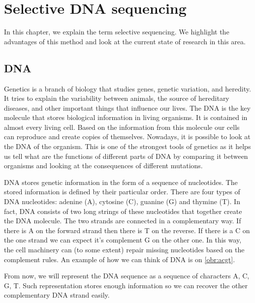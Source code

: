 \chapter{Selective DNA sequencing}
\label{kap:selSeq}

In this chapter, we explain the term selective sequencing. We highlight the
advantages of this method and look at the current state of research in this area.

\section{DNA}

Genetics is a branch of biology that studies genes, genetic variation, and heredity.
It tries to explain the variability between animals, the source of hereditary diseases, and
other important things that influence our lives. The DNA is the key molecule
that stores biological information in living organisms. It is contained in
almost every living cell. Based on the information from this molecule our cells can reproduce and create copies of
themselves. Nowadays, it is possible to look at the DNA of the organism. This is
one of the strongest tools of genetics as it helps us tell what are the functions
of different parts of DNA by comparing it between organisms and looking at the
consequences of different mutations.

DNA stores genetic information in the form of a sequence of nucleotides. The stored
information is defined by their particular order. There are four types of DNA nucleotides:
adenine (A), cytosine (C), guanine (G) and thymine (T). In fact, DNA consists of two long
strings of these nucleotides that together create the DNA molecule. The two strands
are connected in a complementary way. If there is A on the forward strand
then there is T on the reverse. If there is a C on the one strand we can expect
it's complement G on the other one. In this way, the cell machinery can (to some extent) repair
missing nucleotides based on the complement rules. An example of how we can think
of DNA is on \ref{obr:acgt}.

From now, we will represent the DNA sequence as a sequence of characters A, C, G, T.
Such representation stores enough information so we can recover the other complementary
DNA strand easily.



